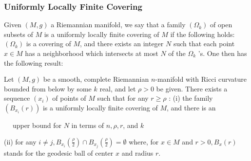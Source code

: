 \documentclass[12pt,hyperref,a4paper,UTF8]{ctexart}
\begin{document}
\subsubsection{Uniformly Locally Finite Covering}
Given $(M, g)$ a Riemannian manifold, we say that a family $\left(\Omega_k\right)$ of open subsets of $M$ is a uniformly locally finite covering of $M$ if the following holds: $\left(\Omega_k\right)$ is a covering of $M$, and there exists an integer $N$ such that each point $x \in M$ has a neighborhood which intersects at most $N$ of the $\Omega_k$ 's. One then has the following result:

\begin{Lemma}
    Let $(M, g)$ be a smooth, complete Riemannian $n$-manifold with Ricci curvature bounded from below by some $k$ real, and let $\rho>0$ be given. There exists a sequence $\left(x_i\right)$ of points of $M$ such that for any $r \geq \rho$ :
\vskip 3pt
    (i) the family $\left(B_{x_i}(r)\right)$ is a uniformly locally finite covering of $M$, and there is an 
    
    $\quad\;$upper bound for $N$ in terms of $n, \rho, r$, and $k$

    (ii) for any $i \neq j, B_{x_i}\left(\frac{\rho}{2}\right) \cap B_{x_j}\left(\frac{\rho}{2}\right)=\emptyset$
\vskip 3pt
\noindent where, for $x \in M$ and $r>0, B_x(r)$ stands for the geodesic ball of center $x$ and radius $r$.
\label{lem21}
\end{Lemma}
\end{document}
